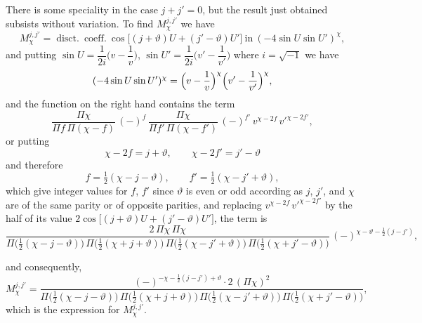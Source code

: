 \documentclass[12pt,a4paper]{article}
\providecommand{\disct}{\mathop{\mathrm{disct.}}}
\theoremstyle{plain}
\begin{document}
\medskip
There is some speciality in the case $j+j'=0$, but the result just obtained subsists without variation. To find $M_{\chi}^{j,j'}$ we have
\[
M_{\chi}^{j,j'}=\disct\ \mathrm{coeff.}\ \cos\bigl[(j+\vartheta)U+(j'-\vartheta)U'\bigr]\ \text{in}\ (-4\sin U\sin U')^{\chi},
\]
and putting $\sin U=\dfrac{1}{2i}\bigl(v-\dfrac{1}{v}\bigr)$, $\sin U'=\dfrac{1}{2i}\bigl(v'-\dfrac{1}{v'}\bigr)$ where $i=\sqrt{-1}$ we have
\[
(-4\sin U\sin U')^{\chi}=\Bigl(v-\dfrac{1}{v}\Bigr)^{\chi}\Bigl(v'-\dfrac{1}{v'}\Bigr)^{\chi},
\]
and the function on the right hand contains the term
\[
\dfrac{\Pi\chi}{\Pi f\,\Pi(\chi-f)}\,(-)^{f}\,\dfrac{\Pi\chi}{\Pi f'\,\Pi(\chi-f')}\,(-)^{f'}\,v^{\chi-2f}\,v'^{\chi-2f'},
\]
or putting
\[
\chi-2f=j+\vartheta,\qquad \chi-2f'=j'-\vartheta
\]
and therefore
\[
f=\tfrac{1}{2}(\chi-j-\vartheta),\qquad f'=\tfrac{1}{2}(\chi-j'+\vartheta),
\]
which give integer values for $f$, $f'$ since $\vartheta$ is even or odd according as $j$, $j'$, and $\chi$ are of the same parity or of opposite parities, and replacing $v^{\chi-2f}\,v'^{\chi-2f'}$ by the half of its value $2\cos\bigl[(j+\vartheta)U+(j'-\vartheta)U'\bigr]$, the term is
\[
\dfrac{2\,\Pi\chi\,\Pi\chi}{\Pi\bigl(\tfrac{1}{2}(\chi-j-\vartheta)\bigr)\,\Pi\bigl(\tfrac{1}{2}(\chi+j+\vartheta)\bigr)\,\Pi\bigl(\tfrac{1}{2}(\chi-j'+\vartheta)\bigr)\,\Pi\bigl(\tfrac{1}{2}(\chi+j'-\vartheta)\bigr)}\,(-)^{\chi-\vartheta-\tfrac{1}{2}(j-j')},
\]

\newpage
{} and consequently,
\[
M_{\chi}^{j,j'}=\dfrac{(-)^{-\chi-\tfrac{1}{2}(j-j')+\vartheta}\cdot 2\,(\Pi\chi)^{2}}{\Pi\bigl(\tfrac{1}{2}(\chi-j-\vartheta)\bigr)\,\Pi\bigl(\tfrac{1}{2}(\chi+j+\vartheta)\bigr)\,\Pi\bigl(\tfrac{1}{2}(\chi-j'+\vartheta)\bigr)\,\Pi\bigl(\tfrac{1}{2}(\chi+j'-\vartheta)\bigr)},
\]
which is the expression for $M_{\chi}^{j,j'}$.
\end{document}
